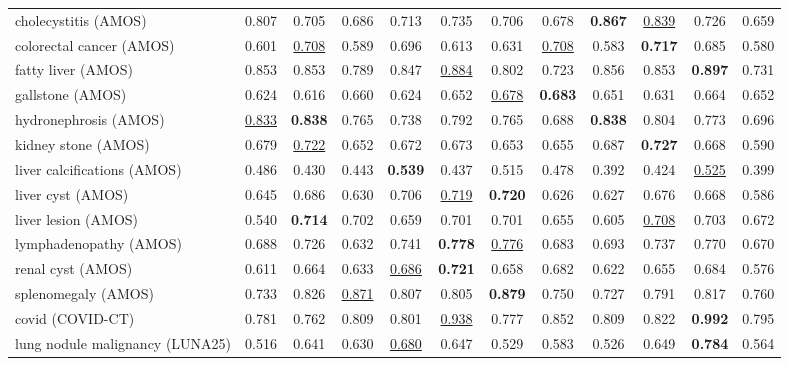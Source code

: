 \begin{minipage}{\textwidth}
{\begin{tabular}{@{}lccccccccccc@{}}
cholecystitis (AMOS) & 0.807 & 0.705 & 0.686 & 0.713 & 0.735 & 0.706 & 0.678 & \textbf{0.867} & \underline{0.839} & 0.726 & 0.659 \\
colorectal cancer (AMOS) & 0.601 & \underline{0.708} & 0.589 & 0.696 & 0.613 & 0.631 & \underline{0.708} & 0.583 & \textbf{0.717} & 0.685 & 0.580 \\
fatty liver (AMOS) & 0.853 & 0.853 & 0.789 & 0.847 & \underline{0.884} & 0.802 & 0.723 & 0.856 & 0.853 & \textbf{0.897} & 0.731 \\
gallstone (AMOS) & 0.624 & 0.616 & 0.660 & 0.624 & 0.652 & \underline{0.678} & \textbf{0.683} & 0.651 & 0.631 & 0.664 & 0.652 \\
hydronephrosis (AMOS) & \underline{0.833} & \textbf{0.838} & 0.765 & 0.738 & 0.792 & 0.765 & 0.688 & \textbf{0.838} & 0.804 & 0.773 & 0.696 \\
kidney stone (AMOS) & 0.679 & \underline{0.722} & 0.652 & 0.672 & 0.673 & 0.653 & 0.655 & 0.687 & \textbf{0.727} & 0.668 & 0.590 \\
liver calcifications (AMOS) & 0.486 & 0.430 & 0.443 & \textbf{0.539} & 0.437 & 0.515 & 0.478 & 0.392 & 0.424 & \underline{0.525} & 0.399 \\
liver cyst (AMOS) & 0.645 & 0.686 & 0.630 & 0.706 & \underline{0.719} & \textbf{0.720} & 0.626 & 0.627 & 0.676 & 0.668 & 0.586 \\
liver lesion (AMOS) & 0.540 & \textbf{0.714} & 0.702 & 0.659 & 0.701 & 0.701 & 0.655 & 0.605 & \underline{0.708} & 0.703 & 0.672 \\
lymphadenopathy (AMOS) & 0.688 & 0.726 & 0.632 & 0.741 & \textbf{0.778} & \underline{0.776} & 0.683 & 0.693 & 0.737 & 0.770 & 0.670 \\
renal cyst (AMOS) & 0.611 & 0.664 & 0.633 & \underline{0.686} & \textbf{0.721} & 0.658 & 0.682 & 0.622 & 0.655 & 0.684 & 0.576 \\
splenomegaly (AMOS) & 0.733 & 0.826 & \underline{0.871} & 0.807 & 0.805 & \textbf{0.879} & 0.750 & 0.727 & 0.791 & 0.817 & 0.760 \\
covid (COVID-CT) & 0.781 & 0.762 & 0.809 & 0.801 & \underline{0.938} & 0.777 & 0.852 & 0.809 & 0.822 & \textbf{0.992} & 0.795 \\
lung nodule malignancy (LUNA25) & 0.516 & 0.641 & 0.630 & \underline{0.680} & 0.647 & 0.529 & 0.583 & 0.526 & 0.649 & \textbf{0.784} & 0.564 \\
\bottomrule
\end{tabular}
}\end{minipage}
\par\bigskip
